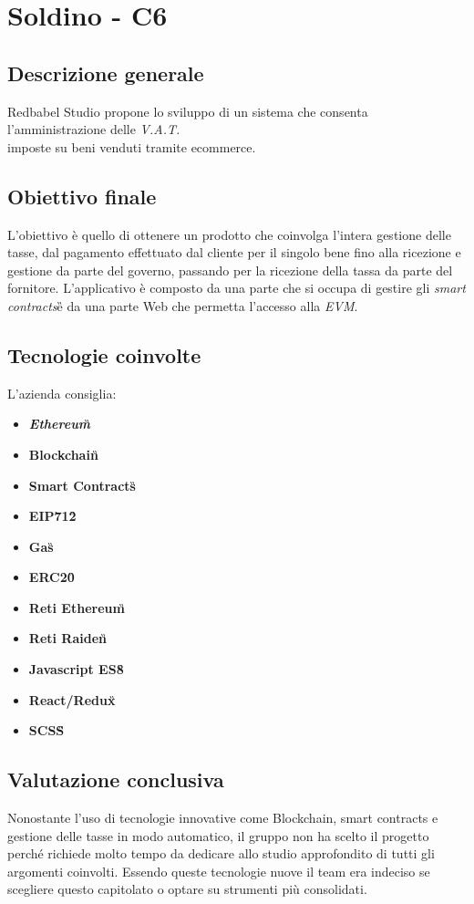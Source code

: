 \section{Soldino - C6} \label{c6}
    \subsection{Descrizione generale}
    Redbabel Studio propone lo sviluppo di un sistema che consenta l'amministrazione delle \textit{V.A.T.}\G \\ imposte su beni venduti tramite ecommerce.
    \subsection{Obiettivo finale}
    
    L'obiettivo è quello di ottenere un prodotto che coinvolga l'intera gestione delle tasse, dal pagamento effettuato dal cliente per il singolo bene fino alla ricezione e gestione da parte del governo, passando per la ricezione della tassa da parte del fornitore.
    L'applicativo è composto da una parte che si occupa di gestire gli \textit{smart contracts}\G e da una parte Web che permetta l'accesso alla \textit{EVM}\GAlt.

    \subsection{Tecnologie coinvolte}
	L'azienda consiglia:
    	\begin{itemize}
        \item \textit{\textbf{Ethereum}}\G
		\item \textbf{Blockchain}\G
        \item \textbf{Smart Contracts}\G
		\item \textbf{EIP712}\G
		\item \textbf{Gas}\G
		\item \textbf{ERC20}\G
		\item \textbf{Reti Ethereum}\G
        \item \textbf{Reti Raiden}\G
        \item \textbf{Javascript ES8}\G
        \item \textbf{React/Redux}\G
        \item \textbf{SCSS}\G
	\end{itemize}
	
    \subsection{Valutazione conclusiva}
    Nonostante l'uso di tecnologie innovative come Blockchain, smart contracts e gestione delle tasse in modo automatico, il gruppo non ha scelto il progetto perché richiede molto tempo da dedicare allo studio approfondito di tutti gli argomenti coinvolti.
    Essendo queste tecnologie nuove il team era indeciso se scegliere questo capitolato o optare su strumenti più consolidati.